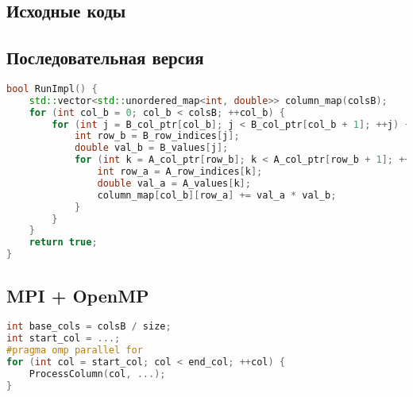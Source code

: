 \documentclass[12pt]{article}
\begin{document}
\newpage
\begin{appendices}
\section{Исходные коды}
\subsection{Последовательная версия}
\begin{lstlisting}[language=C++, caption=RunImpl из ops\_seq.cpp]
bool RunImpl() {
    std::vector<std::unordered_map<int, double>> column_map(colsB);
    for (int col_b = 0; col_b < colsB; ++col_b) {
        for (int j = B_col_ptr[col_b]; j < B_col_ptr[col_b + 1]; ++j) {
            int row_b = B_row_indices[j];
            double val_b = B_values[j];
            for (int k = A_col_ptr[row_b]; k < A_col_ptr[row_b + 1]; ++k) {
                int row_a = A_row_indices[k];
                double val_a = A_values[k];
                column_map[col_b][row_a] += val_a * val_b;
            }
        }
    }
    return true;
}
\end{lstlisting}

\subsection{MPI + OpenMP}
\begin{lstlisting}[language=C++, caption=Распределение столбцов в MPI]
int base_cols = colsB / size;
int start_col = ...;
#pragma omp parallel for
for (int col = start_col; col < end_col; ++col) {
    ProcessColumn(col, ...);
}
\end{lstlisting}
\end{appendices}
\end{document}
